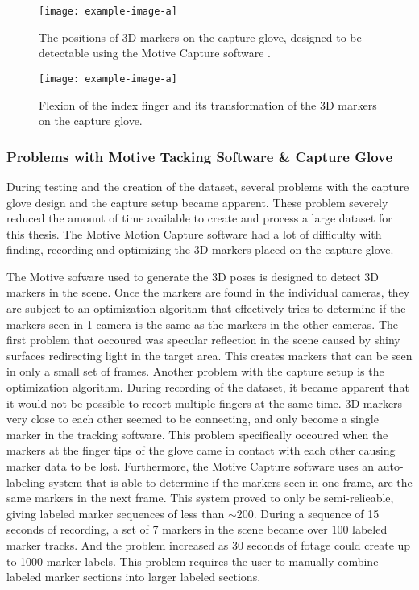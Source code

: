 \documentclass[../main.tex]{subfiles}
\begin{document}
\begin{center}
\begin{figure}[h]
\texttt{[image: example-image-a]}
\caption{The positions of 3D markers on the capture glove, designed to be detectable using the  Motive Capture software \cite{motive}.}
\label{fig:glove}
\end{figure}
\end{center}

\begin{center}
\begin{figure}[h]
\texttt{[image: example-image-a]}
\caption{Flexion of the index finger and its transformation of the 3D markers on the capture glove.}
\label{fig:glove_flex}
\end{figure}
\end{center}

\subsubsection{Problems with Motive Tacking Software \& Capture Glove}

During testing and the creation of the dataset, several problems with the capture glove design and the capture setup became apparent.
These problem severely reduced the amount of time available to create and process a large dataset for this thesis.
The Motive Motion Capture software \cite{motive} had a lot of difficulty with finding, recording and optimizing the 3D markers placed on the capture glove.

The  Motive sofware used to generate the 3D poses is designed to detect 3D markers in the scene.
Once the markers are found in the individual cameras, they are subject to an optimization algorithm that effectively tries to determine if the markers seen in 1 camera is the same as the markers in the other cameras.
The first problem that occoured was specular reflection in the scene caused by shiny surfaces redirecting light in the target area.
This creates  markers that can be seen in only a small set of frames.
Another problem with the capture setup is the optimization algorithm.
During recording of the dataset, it became apparent that it would not be possible to recort multiple fingers at the same time.
3D markers very close to each other seemed to be connecting, and only become a single marker in the tracking software.
This problem specifically occoured when the markers at the finger tips of the glove came in contact with each other causing marker data to be lost.
Furthermore, the Motive Capture software uses an auto-labeling system that is able to determine if the markers seen in one frame, are the same markers in the next frame.
This system proved to only be semi-relieable, giving labeled marker sequences of less than $\sim 200$.
During a sequence of 15 seconds of recording, a set of 7 markers in the scene became over $100$ labeled marker tracks. And the problem increased as 30 seconds of fotage could create up to 1000 marker labels.
This problem requires the user to manually combine labeled marker sections into larger labeled sections.
\end{document}

